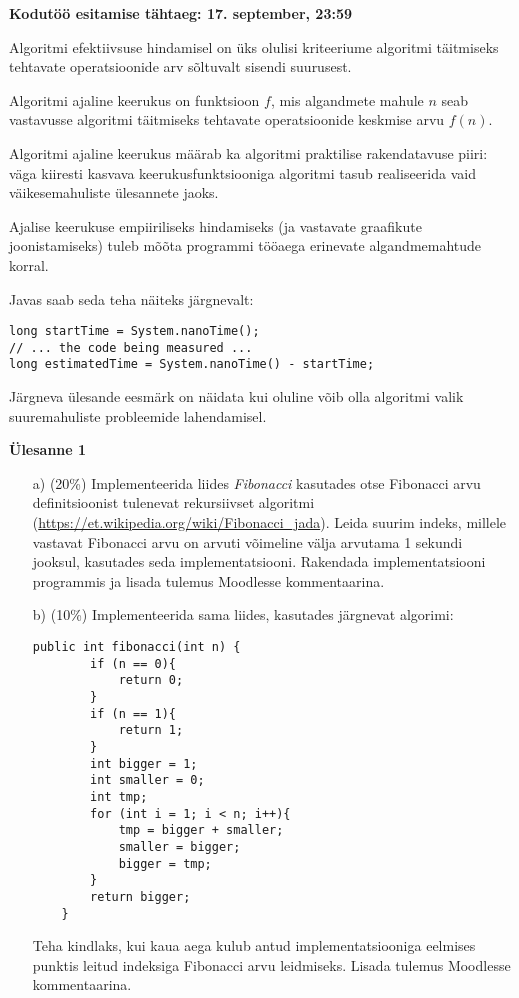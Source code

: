 \documentclass[a4paper]{article}
\begin{document}
\textbf{Kodutöö esitamise tähtaeg: 17. september, 23:59}

Algoritmi efektiivsuse hindamisel on üks olulisi kriteeriume algoritmi
täitmiseks tehtavate operatsioonide arv sõltuvalt sisendi suurusest.


Algoritmi ajaline keerukus on funktsioon $f$, mis algandmete
mahule $n$ seab vastavusse algoritmi täitmiseks tehtavate operatsioonide keskmise arvu $f(n)$. 

Algoritmi ajaline keerukus määrab ka algoritmi praktilise
rakendatavuse piiri: väga kiiresti kasvava keerukusfunktsiooniga
algoritmi tasub realiseerida vaid väikesemahuliste ülesannete jaoks.

Ajalise keerukuse empiiriliseks hindamiseks (ja vastavate graafikute
joonistamiseks) tuleb mõõta programmi tööaega erinevate algandmemahtude
korral.

Javas saab seda teha näiteks järgnevalt:

\begin{lstlisting}
long startTime = System.nanoTime();    
// ... the code being measured ...    
long estimatedTime = System.nanoTime() - startTime;
\end{lstlisting}

Järgneva ülesande eesmärk on näidata kui oluline võib olla algoritmi valik suuremahuliste probleemide lahendamisel.
\begin{problem}
\textbf{Ülesanne 1}
\begin{enumerate}
   \item[a)] (20\%) Implementeerida liides \textit{Fibonacci} kasutades otse Fibonacci arvu definitsioonist tulenevat rekursiivset algoritmi (\url{https://et.wikipedia.org/wiki/Fibonacci_jada}). Leida suurim indeks, millele vastavat Fibonacci arvu on 
arvuti võimeline välja arvutama 1 sekundi jooksul, kasutades seda implementatsiooni. Rakendada implementatsiooni programmis ja lisada tulemus Moodlesse kommentaarina. 
    \item[b)] (10\%) Implementeerida sama liides, kasutades järgnevat algorimi: 
\begin{lstlisting}
public int fibonacci(int n) {
        if (n == 0){
            return 0;
        }
        if (n == 1){
            return 1;
        }
        int bigger = 1;
        int smaller = 0;
        int tmp;
        for (int i = 1; i < n; i++){
            tmp = bigger + smaller;
            smaller = bigger;
            bigger = tmp;
        }
        return bigger;
    }
\end{lstlisting}
Teha kindlaks, kui kaua aega kulub antud implementatsiooniga eelmises punktis leitud indeksiga Fibonacci arvu leidmiseks. Lisada tulemus Moodlesse kommentaarina.

\end{enumerate}

\end{problem}
\end{document}
